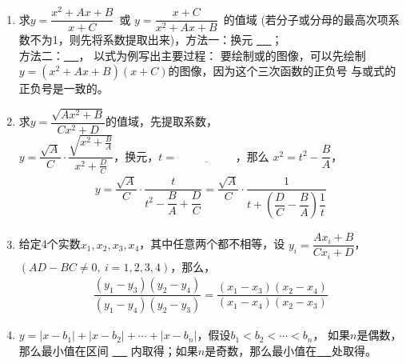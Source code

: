 \documentclass{article}
\newif\ifte
\renewcommand\geq\geqslant
\begin{document}
\begin{multicols}{2}
\begin{enumerate}[leftmargin=20pt]
\item 求$ y=\dfrac{x^2+Ax+B}{x+C} $\ 或
$ y=\dfrac{x+C}{x^2+Ax+B} $\ 的值域
(若分子或分母的最高次项系数不为1，则先将系数提取出来)，方法一：换元
\underline{\ \ifte $ t=x+C $\else \hspace{2cm} \fi\ }；\\
方法二：\underline{\ \ifte 判别式\else \hspace{1.5cm} \fi\ }，
以式为例写出主要过程：\ifte 
\begin{gather*}
    y(x+C)=x^2+Ax+B \\
    x^2+(A-y)x+B-yC=0 \\
    \Delta=(A-y)^2-4(B-yC) \geq 0
\end{gather*}
\else \vspace{1.5cm} \fi  
要绘制或的图像，可以先绘制
$ y=(x^2+Ax+B)(x+C) $的图像，因为这个三次函数的正负号
与或式的正负号是一致的。

\item 求$ y=\dfrac{\sqrt{Ax^2+B}}{Cx^2+D} $的值域，先提取系数，\\
$ y=\dfrac{\sqrt{A}}{C}\cdot\dfrac{\sqrt{x^2+\frac{B}{A}}}{
x^2+\frac{D}{C}} $，换元，$ t=\underline{\ \ifte 
\sqrt{x^2+\dfrac{B}{A}} \else \hspace{2cm} \fi\ } $，那么
$ x^2=t^2-\dfrac{B}{A} $，
\begin{gather*}
    y=\dfrac{\sqrt{A}}{C}\cdot \dfrac{t}{t^2-\dfrac{B}{A}+\dfrac{D}{C}}=
    \dfrac{\sqrt{A}}{C}\cdot \dfrac{1}{t+\left(\dfrac{D}{C}-\dfrac{B}{A}
    \right) \dfrac{1}{t}}
\end{gather*}

\item 给定4个实数$ x_1,x_2,x_3,x_4 $，其中任意两个都不相等，设
$ y_i=\dfrac{Ax_i+B}{Cx_i+D} $，$ (AD-BC\neq 0,\ i=1,2,3,4) $，那么，
\begin{gather*}
    \dfrac{(y_1-y_3)(y_2-y_4)}{(y_1-y_4)(y_2-y_3)}=
    \dfrac{(x_1-x_3)(x_2-x_4)}{(x_1-x_4)(x_2-x_3)}
\end{gather*}

\item $ y=|x-b_1|+|x-b_2|+\cdots+|x-b_n| $，假设$ b_1<b_2<\cdots<b_n $，
如果$ n $是偶数，那么最小值在区间
\underline{\ \ifte $ [b_{\frac{n}{2}},
b_{\frac{n}{2}+1}] $\else \hspace{2cm} \fi\ }
内取得；如果$ n $是奇数，那么最小值在\underline{\ 
\ifte $ x=b_{\frac{n+1}{2}} $\else \hspace{2cm} \fi\ }处取得。


\end{enumerate}
\end{multicols}
\end{document}
